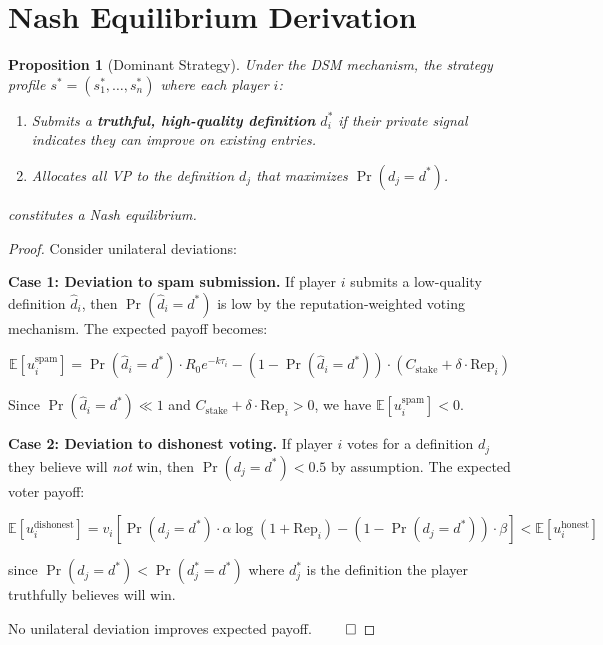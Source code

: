 \documentclass[11pt]{article}
\newtheorem{proposition}{Proposition}
\begin{document}
\section{Nash Equilibrium Derivation}

\begin{proposition}[Dominant Strategy]
Under the DSM mechanism, the strategy profile $s^* = (s_1^*, \dots, s_n^*)$ where each player $i$:
\begin{enumerate}[nosep]
  \item Submits a \textbf{truthful, high-quality definition} $d_i^*$ if their private signal indicates they can improve on existing entries.
  \item Allocates all VP to the definition $d_j$ that maximizes $\Pr(d_j = d^*)$.
\end{enumerate}
constitutes a Nash equilibrium.
\end{proposition}

\begin{proof}
Consider unilateral deviations:

\textbf{Case 1: Deviation to spam submission.}
If player $i$ submits a low-quality definition $\hat{d}_i$, then $\Pr(\hat{d}_i = d^*)$ is low by the reputation-weighted voting mechanism. The expected payoff becomes:

\begin{equation}
\mathbb{E}[u_i^{\text{spam}}] = \Pr(\hat{d}_i = d^*) \cdot R_0 e^{-k\tau_i} - (1 - \Pr(\hat{d}_i = d^*)) \cdot (C_{\text{stake}} + \delta \cdot \text{Rep}_i)
\end{equation}

Since $\Pr(\hat{d}_i = d^*) \ll 1$ and $C_{\text{stake}} + \delta \cdot \text{Rep}_i > 0$, we have $\mathbb{E}[u_i^{\text{spam}}] < 0$.

\textbf{Case 2: Deviation to dishonest voting.}
If player $i$ votes for a definition $d_j$ they believe will \emph{not} win, then $\Pr(d_j = d^*) < 0.5$ by assumption. The expected voter payoff:

\begin{equation}
\mathbb{E}[u_i^{\text{dishonest}}] = v_i \left[\Pr(d_j = d^*) \cdot \alpha \log(1 + \text{Rep}_i) - (1 - \Pr(d_j = d^*)) \cdot \beta \right] < \mathbb{E}[u_i^{\text{honest}}]
\end{equation}

since $\Pr(d_j = d^*) < \Pr(d_j^* = d^*)$ where $d_j^*$ is the definition the player truthfully believes will win.

No unilateral deviation improves expected payoff. $\qed$
\end{proof}
\end{document}
